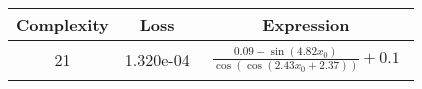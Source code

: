 \begin{center}
        \begin{tabular}{|c|c|c|}
        \hline
        Complexity & Loss & Expression \\
        \hline
        21 & 1.320e-04 & $\begin{aligned}\frac{0.09 - \sin{\left(4.82 x_{0} \right)}}{\cos{\left(\cos{\left(2.43 x_{0} + 2.37 \right)} \right)}} + 0.1\end{aligned}$\\ \hline\end{tabular}
        \end{center}
        